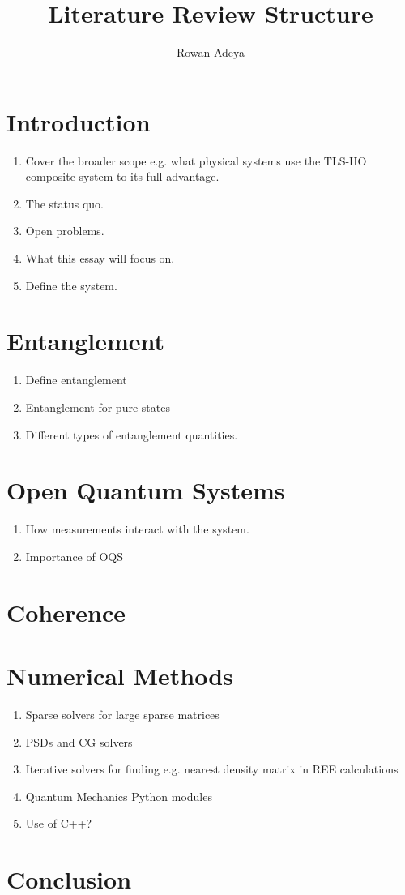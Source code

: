 \documentclass{article}
\title{Literature Review Structure}
\author{Rowan Adeya}
\date{ }
\begin{document}
\maketitle

\tableofcontents

\newpage

\section{Introduction}

\begin{enumerate}
    \item Cover the broader scope e.g. what physical systems use the TLS-HO composite system to its full advantage. 
    \item The status quo.
    \item Open problems. 
    \item What this essay will focus on.
    \item Define the system. 
\end{enumerate}


\section{Entanglement}

\begin{enumerate}
    \item Define entanglement
    \item Entanglement for pure states
    \item Different types of entanglement quantities.
\end{enumerate}

\section{Open Quantum Systems}

\begin{enumerate}
    \item How measurements interact with the system.
    \item Importance of OQS
\end{enumerate}

\section{Coherence}

\section{Numerical Methods}

\begin{enumerate}
    \item Sparse solvers for large sparse matrices
    \item PSDs and CG solvers
    \item Iterative solvers for finding e.g. nearest density matrix in REE calculations
    \item Quantum Mechanics Python modules
    \item Use of C++?
\end{enumerate}

\section{Conclusion}
\end{document}
